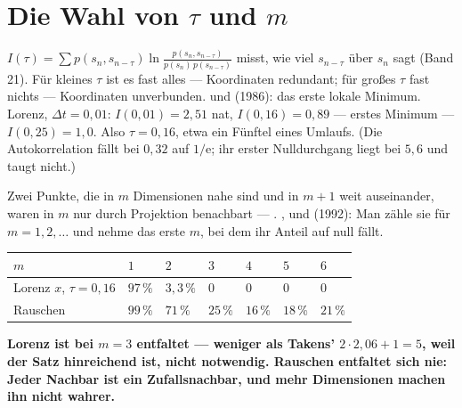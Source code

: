 \section{Die Wahl von $\tau$ und $m$}

\begin{merksatz}
$I(\tau) = \sum p(s_n, s_{n-\tau})\ln\frac{p(s_n, s_{n-\tau})}{p(s_n)\,p(s_{n-\tau})}$ misst, wie viel $s_{n-\tau}$ über $s_n$ sagt (Band 21). Für kleines $\tau$ ist es fast alles --- Koordinaten redundant; für großes $\tau$ fast nichts --- Koordinaten unverbunden.  und  (1986): das erste lokale Minimum. Lorenz, $\Delta t = 0{,}01$: $I(0{,}01) = 2{,}51$ nat, $I(0{,}16) = 0{,}89$ --- erstes Minimum --- $I(0{,}25) = 1{,}0$. Also $\tau = 0{,}16$, etwa ein Fünftel eines Umlaufs. (Die Autokorrelation fällt bei $0{,}32$ auf $1/\mathrm e$; ihr erster Nulldurchgang liegt bei $5{,}6$ und taugt nicht.)

Zwei Punkte, die in $m$ Dimensionen nahe sind und in $m + 1$ weit auseinander, waren in $m$ nur durch Projektion benachbart --- . ,  und  (1992): Man zähle sie für $m = 1, 2, \ldots$ und nehme das erste $m$, bei dem ihr Anteil auf null fällt.

\begin{center}
{\small
\renewcommand{\arraystretch}{1.46}
\begin{tabular}{@{}P{2.8cm}P{1.0cm}P{1.0cm}P{1.0cm}P{1.0cm}P{1.0cm}P{1.0cm}@{}}
\toprule
$m$ & $1$ & $2$ & $3$ & $4$ & $5$ & $6$\\
\midrule
Lorenz $x$, $\tau = 0{,}16$ & $97\,\%$ & $3{,}3\,\%$ & $0$ & $0$ & $0$ & $0$\\
Rauschen & $99\,\%$ & $71\,\%$ & $25\,\%$ & $16\,\%$ & $18\,\%$ & $21\,\%$\\
\bottomrule
\end{tabular}}
\end{center}

\begin{center}
\begin{minipage}{0.9\textwidth}
\textbf{Lorenz ist bei $m = 3$ entfaltet --- weniger als Takens' $2\cdot2{,}06 + 1 = 5$, weil der Satz hinreichend ist, nicht notwendig. Rauschen entfaltet sich nie: Jeder Nachbar ist ein Zufallsnachbar, und mehr Dimensionen machen ihn nicht wahrer.}
\end{minipage}
\end{center}


\end{merksatz}
